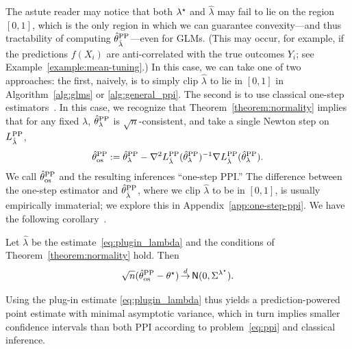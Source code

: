 The astute reader may notice that both $\lambda^\star$ and $\hat{\lambda}$ may
fail to lie on the region $[0, 1]$, which is the only region in which we can
guarantee convexity---and thus tractability of computing $\hat{\theta}^{\mathrm{PP}}_{\hat\lambda}$---even for GLMs. (This may occur, for example, if the
predictions $f(X_i)$ are anti-correlated with the true outcomes $Y_i$;
see Example~\ref{example:mean-tuning}.)  In
this case, we can take one of two approaches: the first, naively, is to
simply clip $\hat{\lambda}$ to lie in $[0, 1]$ in Algorithm~\ref{alg:glms}
or \ref{alg:general_ppi}. The second is to use classical one-step
estimators~\cite[e.g.][Chapter 5.7]{VanDerVaart98}. In this case, we
recognize that Theorem~\ref{theorem:normality} implies that for any fixed
$\lambda$, $\hat{\theta}^{\mathrm{PP}}_\lambda$ is $\sqrt{n}$-consistent, and take a single
Newton step on $L^{\mathrm{PP}}_{\hat\lambda}$,
\begin{equation*}
  \hat{\theta}^{\mathrm{PP}}_{\textup{os}}
  := \hat{\theta}^{\mathrm{PP}}_\lambda - \nabla^2 L^{\mathrm{PP}}_{\hat{\lambda}}(
  \hat{\theta}^{\mathrm{PP}}_\lambda)^{-1} \nabla L^{\mathrm{PP}}_{\hat\lambda}(\hat{\theta}^{\mathrm{PP}}_\lambda).
\end{equation*}
We call $\hat{\theta}^{\mathrm{PP}}_{\textup{os}}$ and the resulting inferences ``one-step
PPI.''
%
The difference between the one-step estimator and $\hat{\theta}^{\mathrm{PP}}_{\hat\lambda}$,
where we clip $\hat\lambda$ to be in $[0, 1]$, is usually empirically
immaterial; we explore this in Appendix~\ref{app:one-step-ppi}. We have the
following corollary~\cite[Thm.~5.45]{VanDerVaart98}.
\begin{corollary}
\label{cor:one-step}
  Let $\hat{\lambda}$ be the estimate~\eqref{eq:plugin_lambda}
  and the conditions of Theorem~\ref{theorem:normality} hold. Then
  \begin{equation*}
    \sqrt{n} (\hat{\theta}^{\mathrm{PP}}_{\textup{os}} - \theta^\star)
    \mathop{\stackrel{d}{\rightarrow}} \mathsf{N}(0, \Sigma^{\lambda^\star}).
  \end{equation*}
\end{corollary}
Using the plug-in estimate \eqref{eq:plugin_lambda} thus yields a
prediction-powered point estimate with minimal asymptotic variance, which in
turn implies smaller confidence intervals than both PPI according to  problem~\eqref{eq:ppi} and classical inference.


